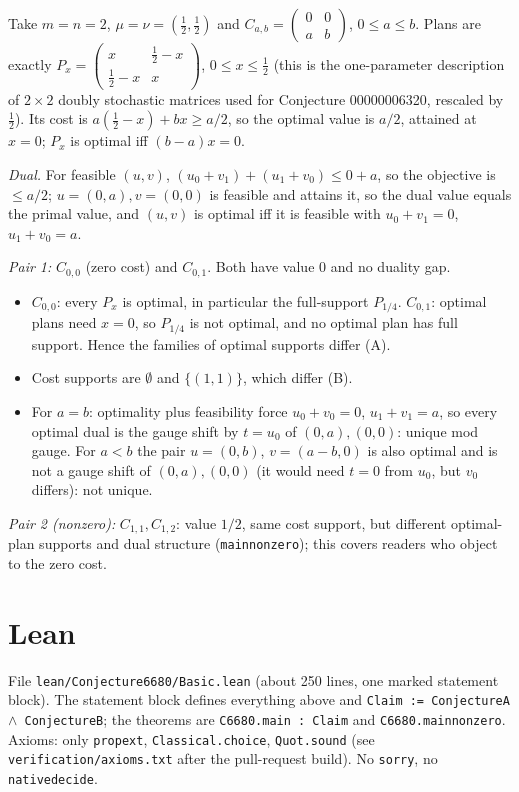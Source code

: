 \documentclass[11pt]{article}
\renewcommand{\_}{\oldus\allowbreak}
\theoremstyle{definition}
\theoremstyle{remark}
\begin{document}
Take $m=n=2$, $\mu=\nu=(\tfrac12,\tfrac12)$ and $C_{a,b}=\begin{pmatrix}0&0\\a&b\end{pmatrix}$, $0\le a\le b$.
Plans are exactly $P_x=\begin{pmatrix}x&\frac12-x\\ \frac12-x&x\end{pmatrix}$, $0\le x\le\frac12$
(this is the one-parameter description of $2\times2$ doubly stochastic matrices used for Conjecture 00000006320,
rescaled by $\tfrac12$). Its cost is $a(\tfrac12-x)+bx\ge a/2$, so the optimal value is $a/2$, attained at $x=0$;
$P_x$ is optimal iff $(b-a)x=0$.

\emph{Dual.} For feasible $(u,v)$, $(u_0+v_1)+(u_1+v_0)\le 0+a$, so the objective is $\le a/2$; $u=(0,a),v=(0,0)$
is feasible and attains it, so the dual value equals the primal value, and $(u,v)$ is optimal iff it is feasible
with $u_0+v_1=0$, $u_1+v_0=a$.

\emph{Pair 1:} $C_{0,0}$ (zero cost) and $C_{0,1}$. Both have value $0$ and no duality gap.
\begin{itemize}
\item $C_{0,0}$: every $P_x$ is optimal, in particular the full-support $P_{1/4}$. $C_{0,1}$: optimal plans need
 $x=0$, so $P_{1/4}$ is not optimal, and no optimal plan has full support. Hence the families of optimal supports differ (A).
\item Cost supports are $\emptyset$ and $\{(1,1)\}$, which differ (B).
\item For $a=b$: optimality plus feasibility force $u_0+v_0=0$, $u_1+v_1=a$, so every optimal dual is the gauge
 shift by $t=u_0$ of $(0,a),(0,0)$: unique mod gauge. For $a<b$ the pair $u=(0,b)$, $v=(a-b,0)$ is also optimal
 and is not a gauge shift of $(0,a),(0,0)$ (it would need $t=0$ from $u_0$, but $v_0$ differs): not unique.
\end{itemize}
\emph{Pair 2 (nonzero):} $C_{1,1},C_{1,2}$: value $1/2$, same cost support, but different optimal-plan supports
and dual structure (\texttt{main\_nonzero}); this covers readers who object to the zero cost.

\section{Lean}

File \texttt{lean/Conjecture6680/Basic.lean} (about 250 lines, one marked statement block). The statement block
defines everything above and \texttt{Claim := ConjectureA $\wedge$ ConjectureB}; the theorems are
\texttt{C6680.main : Claim} and \texttt{C6680.main\_nonzero}. Axioms: only \texttt{propext},
\texttt{Classical.choice}, \texttt{Quot.sound} (see \texttt{verification/axioms.txt} after the pull-request
build). No \texttt{sorry}, no \texttt{native\_decide}.
\end{document}
